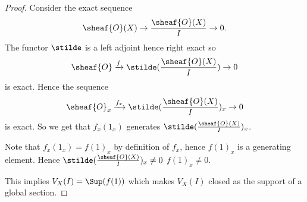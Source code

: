 
\begin{proof}
Consider the exact sequence 
\[\sheaf{O}(X)\rightarrow \frac{\sheaf{O}(X)}{I} \rightarrow 0.\]
The functor $\stilde$ is a left adjoint hence right exact so 
\[\sheaf{O} \xrightarrow{f} \stilde(\frac{\sheaf{O}(X)}{I}) \rightarrow 0\]
is exact.
Hence the sequence
\[\sheaf{O}_x \xrightarrow{f_x} \stilde(\frac{\sheaf{O}(X)}{I})_x \rightarrow 0\]
is exact. 
So we get that $f_x(1_x)$ generates $\stilde(\frac{\sheaf{O}(X)}{I})_x$.

Note that $f_x(1_x) = f(1)_x$ by definition of $f_x$, hence $f(1)_x$ is a generating element.
Hence $\stilde(\frac{\sheaf{O}(X)}{I})_x \neq 0$ \iff $f(1)_x \neq 0$. 

This implies $V_X(I) = \Sup(f(1))$ which makes $V_X(I)$ closed as the support of a global section.
\end{proof}